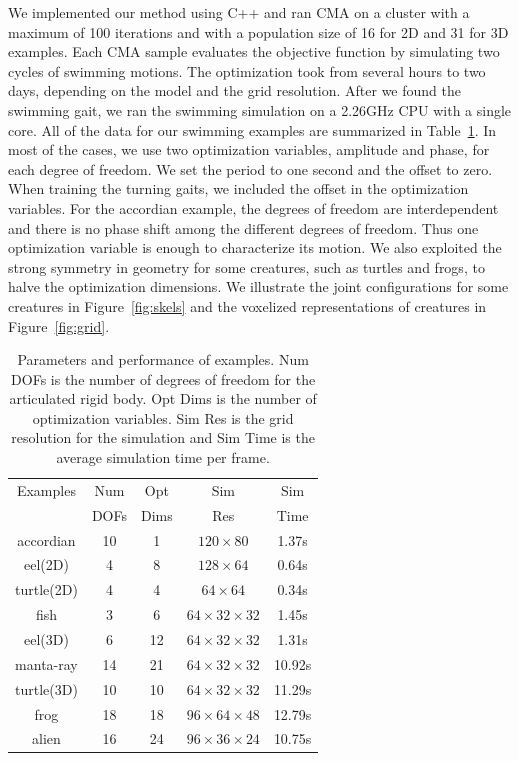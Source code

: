 We implemented our method using C++ and ran CMA on a cluster with a
maximum of 100 iterations and with a population size of 16 for 2D and 31 for 3D
examples. Each CMA sample evaluates the objective function by simulating
two cycles of swimming motions. The optimization took from several hours
to two days, depending on the model and the grid resolution. After we
found the swimming gait, we ran the swimming simulation on a 2.26GHz CPU
with a single core.  All of the data for our swimming examples are
summarized in Table~\ref{table:simData}. In most of the cases, we use two
optimization variables, amplitude and phase, for each degree of freedom.
We set the period to one second and the offset to zero. When training the
turning gaits, we included the offset in the optimization variables. For the
accordian example, the degrees of freedom are interdependent and there is
no phase shift among the different degrees of freedom. Thus one
optimization variable is enough to characterize its motion. We also
exploited the strong symmetry in geometry for some creatures, such as
turtles and frogs, to halve the optimization dimensions. We illustrate the
joint configurations for some creatures in Figure~\ref{fig:skels} and the voxelized representations of creatures in Figure~\ref{fig:grid}.

\begin{table}
\centering
\begin{tabular}{|c|c|c|c|c|}
\hline
Examples & Num & Opt  & Sim  & Sim\\
         & DOFs & Dims & Res & Time \\
 \hline
accordian & 10 & 1 &  $120\times 80$           & 1.37s\\
eel(2D)   & 4  & 8 &  $128 \times 64$         &  0.64s \\
turtle(2D)& 4  & 4 & $64\times 64$           & 0.34s \\
fish      & 3  & 6  & $64\times 32\times 32$  & 1.45s\\
eel(3D)   & 6  & 12 &  $64\times 32\times 32$ & 1.31s\\
manta-ray & 14 & 21 &  $64\times 32\times 32$ & 10.92s\\
turtle(3D)& 10 & 10 &  $64\times 32\times 32$ & 11.29s\\
frog      & 18 & 18 &  $96\times 64\times 48$ & 12.79s\\
alien     & 16 & 24 &  $96\times 36\times 24$ & 10.75s\\

\hline
 \end{tabular}
 \caption{Parameters and performance of examples. Num DOFs is the number of degrees of freedom for the articulated rigid body. Opt Dims is the number of optimization variables. Sim Res is the grid resolution for the simulation and Sim Time is the average simulation time per frame.}
 \label{table:simData}
 \end{table}

